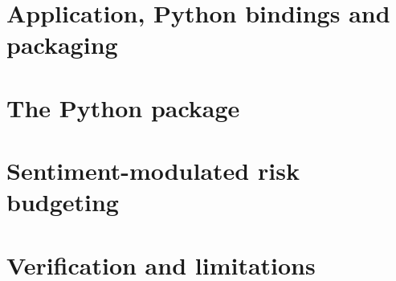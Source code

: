 \documentclass[11pt,a4paper,oneside]{report}
\begin{document}
\part{Application, Python bindings and packaging}\label{part:bindings}



\part{The Python package}\label{part:python}


\part{Sentiment-modulated risk budgeting}\label{part:sentiment}


\part{Verification and limitations}\label{part:verification}


\appendix


\end{document}
